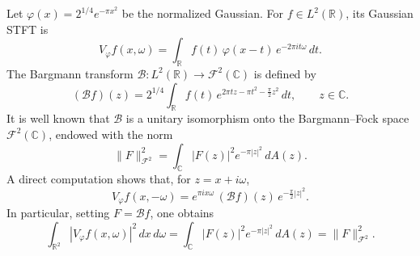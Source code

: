 \documentclass[a4paper,11pt,reqno]{amsart}
\numberwithin{equation}{section}
\theoremstyle{plain} %
\theoremstyle{definition} %
\theoremstyle{remark}
\begin{document}
Let $\varphi(x) = 2^{1/4} e^{-\pi x^2}$ be the normalized Gaussian. For $f \in L^2(\mathbb{R})$, its Gaussian STFT is
\begin{equation}\label{eq:STFT}
V_\varphi f(x,\omega)
= \int_{\mathbb{R}} f(t)\, \varphi(x-t)\, e^{-2\pi i t \omega}\, dt.
\end{equation}
The Bargmann transform
$\mathcal{B} : L^2(\mathbb{R}) \to \mathcal{F}^2(\mathbb{C})$ is defined by
\begin{equation}\label{eq:Bargmann}
(\mathcal{B}f)(z)
= 2^{1/4} \int_{\mathbb{R}} f(t)\, e^{2\pi t z - \pi t^2 - \frac{\pi}{2} z^2}\, dt,
\qquad z \in \mathbb{C}.
\end{equation}
It is well known that $\mathcal{B}$ is a unitary isomorphism onto the Bargmann--Fock
space $\mathcal{F}^2(\mathbb{C})$, endowed with the norm
\[
\|F\|_{\mathcal{F}^2}^2
= \int_{\mathbb{C}} |F(z)|^2 e^{-\pi |z|^2} \, dA(z).
\]
A direct computation shows that, for $z = x + i\omega$,
\begin{equation}\label{eq:STFT-B}
V_\varphi f(x,-\omega)
= e^{\pi i x \omega}\, (\mathcal{B}f)(z)\, e^{-\frac{\pi}{2}|z|^2}.
\end{equation}
In particular, setting $F = \mathcal{B}f$, one obtains
\begin{equation}\label{eq:energy}
\int_{\mathbb{R}^2} |V_\varphi f(x,\omega)|^2 \, dx\, d\omega
= \int_{\mathbb{C}} |F(z)|^2 e^{-\pi |z|^2} \, dA(z)
= \|F\|_{\mathcal{F}^2}^2.
\end{equation}

\medskip

\noindent
\end{document}
